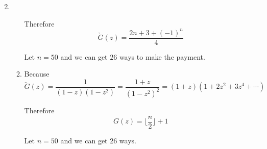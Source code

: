 \documentclass[12pt,a4paper]{ctexart}
\makeatletter
\newtheorem*{solution}{Solution}
\theoremstyle{definition}
\renewenvironment{solution}[1][Solution] {\par\pushQED{\qed}\normalfont\topsep6\p@\@plus6\p@\relax\trivlist\item[\hskip\labelsep\bfseries#1\@addpunct{.}]\ignorespaces}{\popQED\endtrivlist\@endpefalse} \makeatother
\makeatother
\begin{document}
\begin{enumerate}
\begin{solution}
\begin{enumerate}
        		    Therefore
        		    \begin{equation*}
        		        [z^n]\check{G}(z)=\frac{2n+3+(-1)^n}{4}
        		    \end{equation*}
        		    
        		    Let $n=50$ and we can get $26$ ways to make the payment.
        		\item 
        		    Because
        		    \begin{equation*}
        		        \check{G}(z)=\frac{1}{(1-z)(1-z^2)}=\frac{1+z}{(1-z^2)^2}=(1+z)(1+2z^2+3z^4+\cdots)
        		    \end{equation*}
        		    
        		    Therefore
        		    \begin{equation*}
        		        [z^n]G(z)=\lfloor \frac{n}{2} \rfloor +1
        		    \end{equation*}
        		    
        		    Let $n=50$ and we can get 26 ways.
        	\end{enumerate}
        \end{solution}
\end{enumerate}

\end{document}
